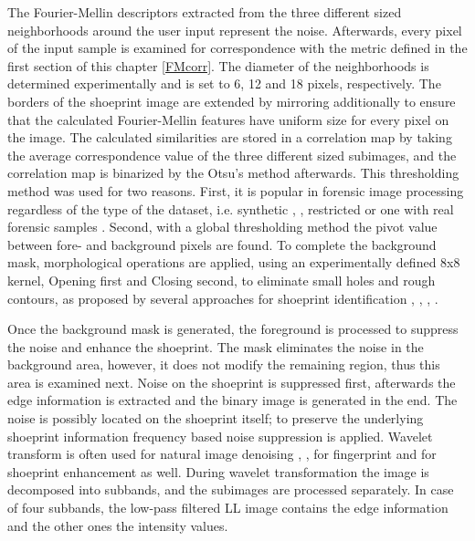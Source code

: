 \documentclass[draft,final]{vutinfth} %
\begin{document}
\par
The Fourier-Mellin descriptors extracted from the three different sized neighborhoods around the user input represent the noise. Afterwards, every pixel of the input sample is examined for correspondence with the metric defined in the first section of this chapter \ref{FMcorr}.
The diameter of the neighborhoods is determined experimentally and is set to 6, 12 and 18 pixels, respectively. 
The borders of the shoeprint image are extended by mirroring additionally to ensure that the calculated Fourier-Mellin features have uniform size for every pixel on the image.
The calculated similarities are stored in a correlation map by taking the average correspondence value of the three different sized subimages, and the correlation map is binarized by the Otsu's method afterwards.
This thresholding method was used for two reasons.
First, it is popular in  forensic image processing regardless of the type of the dataset, i.e. synthetic \cite{algarni2008novel}, \cite{alizadeh2017automatic}, restricted \cite{kong2014novel} or one with real forensic samples \cite{wu2019crime}.
Second, with a global thresholding method the pivot value between fore- and background pixels are found.
To complete the background mask, morphological operations are applied, using an experimentally defined 8x8 kernel, Opening first and Closing second, to eliminate small holes and rough contours, as proposed by several approaches for shoeprint identification \cite{wang2014automatic}, \cite{kong2014novel}, \cite{li2014retrieval}, \cite{tang2010footwear}. 
\par
Once the background mask is generated, the foreground is processed to suppress the noise and enhance the shoeprint.
The mask eliminates the noise in the background area, however, it does not modify the remaining region, thus this area is examined next.
Noise on the shoeprint is suppressed first, afterwards the edge information is extracted and the binary image is generated in the end.
The noise is possibly located on the shoeprint itself; to preserve the underlying shoeprint information frequency based noise suppression is applied.
Wavelet transform is often used for natural image denoising \cite{xu2016image}, \cite{sugamya2016image}, for fingerprint \cite{li2012texture} and for shoeprint enhancement \cite{katireddy2017novel} as well.
During wavelet transformation the image is decomposed into subbands, and the subimages are processed separately.
In case of four subbands, the low-pass filtered LL image contains the edge information and the other ones the intensity values.
\end{document}
